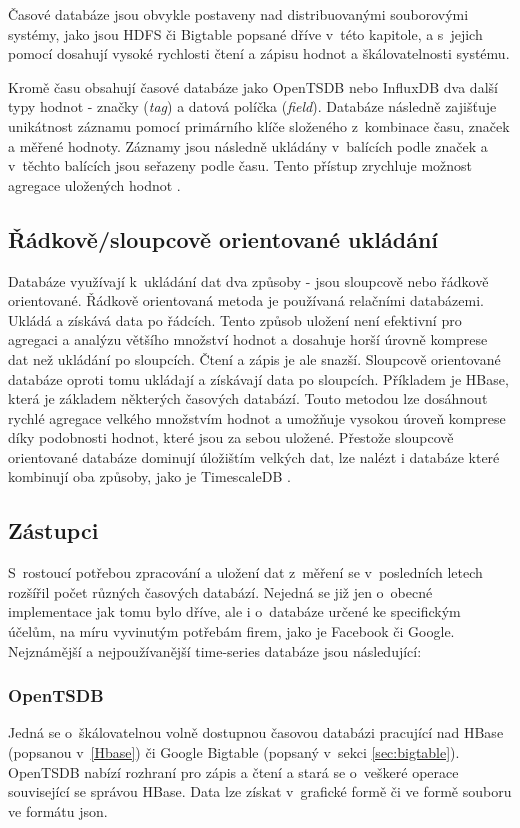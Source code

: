 Časové databáze jsou obvykle postaveny nad distribuovanými souborovými systémy, jako jsou HDFS či Bigtable popsané dříve v~této kapitole, a s~jejich pomocí dosahují vysoké rychlosti čtení a zápisu hodnot a škálovatelnosti systému.

Kromě času obsahují časové databáze jako OpenTSDB nebo InfluxDB dva další typy hodnot - značky (\textit{tag}) a datová políčka (\textit{field}). Databáze následně zajišťuje unikátnost záznamu pomocí primárního klíče složeného z~kombinace času, značek a měřené hodnoty. Záznamy jsou následně ukládány v~balících podle značek a v~těchto balících jsou seřazeny podle času. Tento přístup zrychluje možnost agregace uložených hodnot \cite{time-series-book}.

\subsection{Řádkově/sloupcově orientované ukládání}
Databáze využívají k~ukládání dat dva způsoby - jsou sloupcově nebo řádkově orientované. Řádkově orientovaná metoda je používaná relačními databázemi. Ukládá a získává data po řádcích. Tento způsob uložení není efektivní pro agregaci a analýzu většího množství hodnot a dosahuje horší úrovně komprese dat než ukládání po sloupcích. Čtení a zápis je ale snazší. Sloupcově orientované databáze oproti tomu ukládají a získávají data po sloupcích. Příkladem je HBase, která je základem některých časových databází. Touto metodou lze dosáhnout rychlé agregace velkého množstvím hodnot a umožňuje vysokou úroveň komprese díky podobnosti hodnot, které jsou za sebou uložené. Přestože sloupcově orientované databáze dominují úložištím velkých dat, lze nalézt i databáze které kombinují oba způsoby, jako je TimescaleDB \cite{rowColumn}.

\subsection{Zástupci}
S~rostoucí potřebou zpracování a uložení dat z~měření se v~posledních letech rozšířil počet různých časových databází. Nejedná se již jen o~obecné implementace jak tomu bylo dříve, ale i o~databáze určené ke specifickým účelům, na míru vyvinutým potřebám firem, jako je Facebook či Google. Nejznámější a nejpoužívanější time-series databáze jsou následující:

\subsubsection*{OpenTSDB}
Jedná se o~škálovatelnou volně dostupnou časovou databázi pracující nad HBase (popsanou v~\ref{Hbase}) či Google Bigtable (popsaný v~sekci \ref{sec:bigtable}). OpenTSDB nabízí rozhraní pro zápis a čtení a stará se o~veškeré operace související se správou HBase. Data lze získat v~grafické formě či ve formě souboru ve formátu json.


